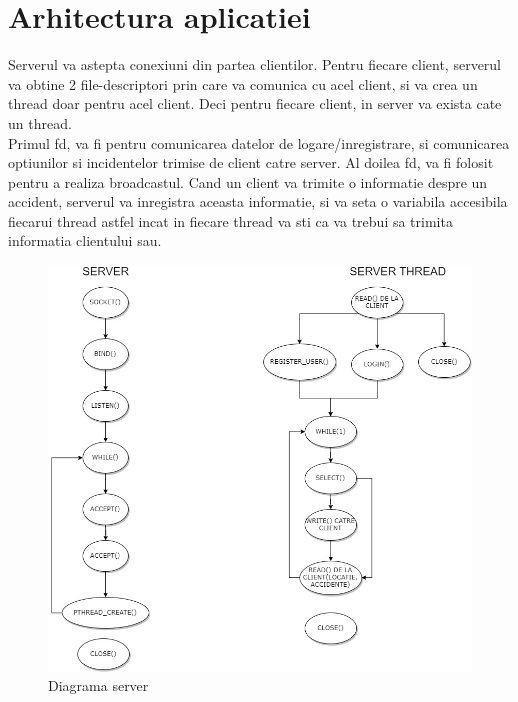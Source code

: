 \documentclass[runningheads]{llncs}
\begin{document}
\section{Arhitectura aplicatiei}

Serverul va astepta conexiuni din partea clientilor. Pentru fiecare client, serverul va obtine 2 file-descriptori prin care va comunica cu acel client, si va crea un thread doar pentru acel client. Deci pentru fiecare client, in server va exista cate un thread.\\

Primul fd, va fi pentru comunicarea datelor de logare/inregistrare, si comunicarea optiunilor si incidentelor trimise de client catre server. Al doilea fd, va fi folosit pentru a realiza broadcastul. Cand un client va trimite o informatie despre un accident, serverul va inregistra aceasta informatie, si va seta o variabila accesibila fiecarui thread astfel incat in fiecare thread va sti ca va trebui sa trimita informatia clientului sau.\\
\begin{figure}[H]
\includegraphics[width=\textwidth]{SERVER_SERVER_THREAD.jpg}
\caption{Diagrama server}
\end{figure}
\end{document}
